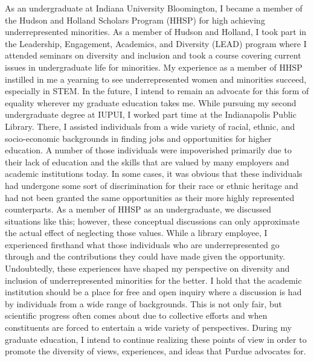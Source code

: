 \documentclass{article}
\begin{document}
As an undergraduate at Indiana University Bloomington, I became a member of the Hudson and Holland Scholars Program (HHSP) for high achieving underrepresented minorities. As a member of Hudson and Holland, I took part in the Leadership, Engagement, Academics, and Diversity (LEAD) program where I attended seminars on diversity and inclusion and took a course covering current issues in undergraduate life for minorities. My experience as a member of HHSP instilled in me a yearning to see underrepresented women and minorities succeed, especially in STEM. In the future, I intend to remain an advocate for this form of equality wherever my graduate education takes me. 
	While pursuing my second undergraduate degree at IUPUI, I worked part time at the Indianapolis Public Library. There, I assisted individuals from a wide variety of racial, ethnic, and socio-economic backgrounds in finding jobs and opportunities for higher education. A number of those individuals were impoverished primarily due to their lack of education and the skills that are valued by many employers and academic institutions today. In some cases, it was obvious that these individuals had undergone some sort of discrimination for their race or ethnic heritage and had not been granted the same opportunities as their more highly represented counterparts. As a member of HHSP as an undergraduate, we discussed situations like this; however, these conceptual discussions can only approximate the actual effect of neglecting those values. While a library employee, I experienced firsthand what those individuals who are underrepresented go through and the contributions they could have made given the opportunity.
	Undoubtedly, these experiences have shaped my perspective on diversity and inclusion of underrepresented minorities for the better. I hold that the academic institution should be a place for free and open inquiry where a discussion is had by individuals from a wide range of backgrounds. This is not only fair, but scientific progress often comes about due to collective efforts and when constituents are forced to entertain a wide variety of perspectives. During my graduate education, I intend to continue realizing these points of view in order to promote the diversity of views, experiences, and ideas that Purdue advocates for. 
\end{document}
